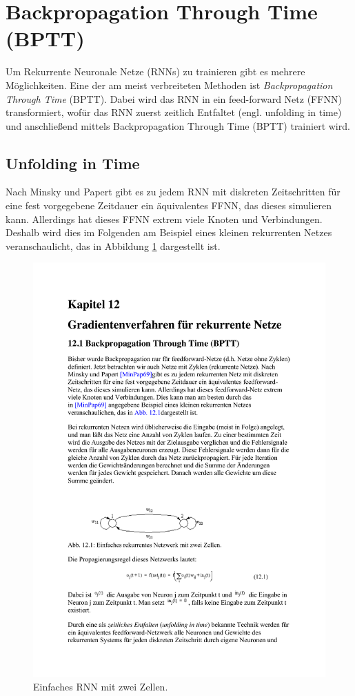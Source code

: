 \section*{Backpropagation Through Time (BPTT)}
Um Rekurrente Neuronale Netze (RNNs) zu trainieren gibt es mehrere Möglichkeiten. Eine der am meist verbreiteten Methoden ist \emph{Backpropagation Through Time} (BPTT).
Dabei wird das RNN in ein feed-forward Netz (FFNN) transformiert, wofür das RNN zuerst zeitlich Entfaltet (engl. unfolding in time) und anschließend mittels Backpropagation Through Time (BPTT) trainiert wird.

\subsection*{Unfolding in Time}
Nach Minsky und Papert gibt es zu jedem RNN mit diskreten Zeitschritten für eine fest vorgegebene Zeitdauer ein äquivalentes FFNN, das dieses simulieren kann.
Allerdings hat dieses FFNN extrem viele Knoten und Verbindungen. Deshalb wird dies im Folgenden am Beispiel eines kleinen rekurrenten Netzes veranschaulicht, das in Abbildung \ref{fig:ch05_einfaches-rnn} dargestellt ist.

\begin{figure}[ht!] \centering 
	\includegraphics[width=\linewidth]{figures/ch05_einfaches-rnn.pdf}
	\caption{Einfaches RNN mit zwei Zellen.}
	\label{fig:ch05_einfaches-rnn}
\end{figure}

